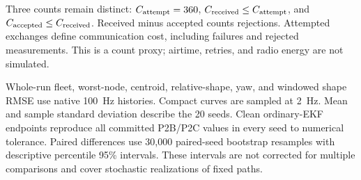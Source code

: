 Three counts remain distinct: \(C_{\rm attempt}=360\), \(C_{\rm received}\leq C_{\rm attempt}\), and \(C_{\rm accepted}\leq C_{\rm received}\). Received minus accepted counts rejections. Attempted exchanges define communication cost, including failures and rejected measurements. This is a count proxy; airtime, retries, and radio energy are not simulated.

Whole-run fleet, worst-node, centroid, relative-shape, yaw, and windowed shape RMSE use native \SI{100}{Hz} histories. Compact curves are sampled at \SI{2}{Hz}. Mean and sample standard deviation describe the 20 seeds. Clean ordinary-EKF endpoints reproduce all committed P2B/P2C values in every seed to numerical tolerance. Paired differences use 30,000 paired-seed bootstrap resamples with descriptive percentile 95\% intervals. These intervals are not corrected for multiple comparisons and cover stochastic realizations of fixed paths.

